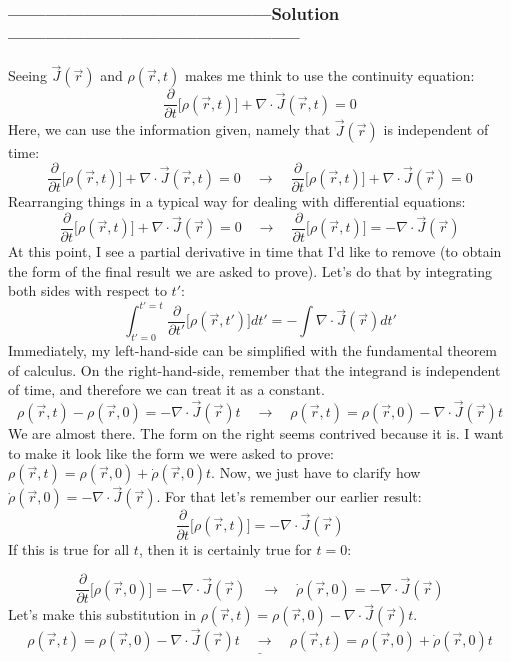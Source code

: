 \documentclass[a4paper,12pt]{article} %
\begin{document}
\subsubsection*{------------------------------------------Solution-----------------------------------------------}
Seeing $\vec{J}(\vec{r})$ and $\rho(\vec{r}, t)$ makes me think to use the continuity equation:
\begin{equation}
\frac{\partial}{\partial t}\Big[\rho(\vec{r}, t)\Big]+\nabla \cdot \vec{J}(\vec{r}, t)=0
	\label{eq:cont-eq}
\end{equation}
Here, we can use the information given, namely that $\vec{J}(\vec{r})$ is independent of time:
$$ \frac{\partial}{\partial t}\Big[\rho(\vec{r}, t)\Big]+\nabla \cdot \vec{J}(\vec{r}, t)=0 \quad\rightarrow\quad \frac{\partial}{\partial t}\Big[\rho(\vec{r}, t)\Big]+\nabla \cdot \vec{J}(\vec{r})=0 $$
Rearranging things in a typical way for dealing with differential equations:
$$ \frac{\partial}{\partial t}\Big[\rho(\vec{r}, t)\Big]+\nabla \cdot \vec{J}(\vec{r})=0 \quad\rightarrow\quad \frac{\partial}{\partial t}\Big[\rho(\vec{r}, t)\Big]=- \nabla \cdot \vec{J}(\vec{r})$$
At this point, I see a partial derivative in time that I'd like to remove (to obtain the form of the final result we are asked to prove). Let's do that by integrating both sides with respect to $t'$:
$$ \int_{t'=0}^{t'=t} \frac{\partial}{\partial t'}\Big[\rho(\vec{r}, t')\Big] dt' = -\int \nabla \cdot \vec{J}(\vec{r}) dt' $$
Immediately, my left-hand-side can be simplified with the fundamental theorem of calculus. On the right-hand-side, remember that the integrand is independent of time, and therefore we can treat it as a constant.
$$ \rho(\vec{r}, t) - \rho(\vec{r}, 0) = -\nabla\cdot\vec{J}(\vec{r})t \quad\rightarrow\quad \rho(\vec{r}, t) = \rho(\vec{r}, 0) -\nabla\cdot\vec{J}(\vec{r})t  $$
We are almost there. The form on the right seems contrived because it is. I want to make it look like the form we were asked to prove: $\rho(\vec{r}, t)=\rho(\vec{r}, 0)+\dot{\rho}(\vec{r}, 0) t$. Now, we just have to clarify how $\dot{\rho}(\vec{r}, 0) = -\nabla\cdot\vec{J}(\vec{r})$. For that let's remember our earlier result:
$$ \frac{\partial}{\partial t}\Big[\rho(\vec{r}, t)\Big]=-\nabla \cdot \vec{J}(\vec{r}) $$
If this is true for all $t$, then it is certainly true for $t=0$:

$$ \frac{\partial}{\partial t}\Big[\rho(\vec{r}, 0)\Big]=-\nabla \cdot \vec{J}(\vec{r}) \quad\rightarrow\quad \dot{\rho}(\vec{r}, 0)=-\nabla \cdot \vec{J}(\vec{r})  $$
Let's make this substitution in $\rho(\vec{r}, t)=\rho(\vec{r}, 0)-\nabla \cdot \vec{J}(\vec{r}) t$.
$$\underline{\boxed{\rho(\vec{r}, t)=\rho(\vec{r}, 0)-\nabla \cdot \vec{J}(\vec{r}) t \quad\rightarrow\quad \rho(\vec{r}, t)=\rho(\vec{r}, 0)+\dot{\rho}(\vec{r}, 0) t}} $$
\end{document}
